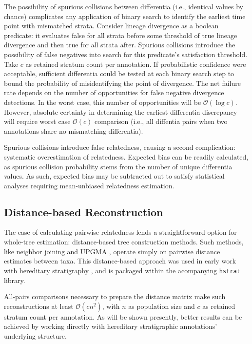 The possibility of spurious collisions between differentia (i.e., identical values by chance) complicates any application of binary search to identify the earliest time point with mismatched strata.
Consider lineage divergence as a boolean predicate: it evaluates false for all strata before some threshold of true lineage divergence and then true for all strata after.
Spurious collisions introduce the possibility of false negatives into search for this predicate's satisfaction threshold.
Take $c$ as retained stratum count per annotation.
If probabilistic confidence were acceptable, sufficient differentia could be tested at each binary search step to bound the probability of misidentifying the point of divergence.
The net failure rate depends on the number of opportunities for false negative divergence detections.
In the worst case, this number of opportunities will be $\mathcal{O}(\log c)$.
However, absolute certainty in determining the earliest differentia discrepancy will require worst case $\mathcal{O}(c)$ comparison (i.e., all diffentia pairs when two annotations share no mismatching differentia).

Spurious collisions introduce false relatedness, causing a second complication: systematic overestimation of relatedness.
Expected bias can be readily calculated, as spurious collision probability stems from the number of unique differentia values.
As such, expected bias may be subtracted out to satisfy statistical analyses requiring mean-unbiased relatedness estimation.

\subsection{Distance-based Reconstruction}
\label{sec:distance-based-reconstruction}

The ease of calculating pairwise relatedness lends a straightforward option for whole-tree estimation: distance-based tree construction methods.
Such methods, like neighbor joining and UPGMA \citep{peng2007distance}, operate simply on pairwise distance estimates between taxa.
This distance-based approach was used in early work with hereditary stratigraphy \citep{moreno2022hereditary}, and is packaged within the acompanying \texttt{hstrat} library.

All-pairs comparisons necessary to prepare the distance matrix make such reconstructions at least $\mathcal{O}(c n^2)$, with $n$ as population size and $c$ as retained stratum count per annotation.
As will be shown presently, better results can be achieved by working directly with hereditary stratigraphic annotations' underlying structure.

